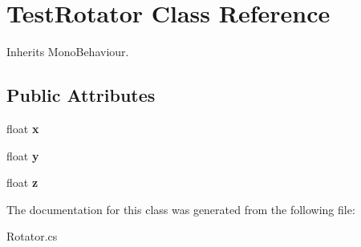 \hypertarget{class_test_rotator}{\section{Test\+Rotator Class Reference}
\label{class_test_rotator}
}


Inherits Mono\+Behaviour.

\subsection*{Public Attributes}
\begin{DoxyCompactItemize}
\item 
\hypertarget{class_test_rotator_a35747d7e4726859f308aca6e1cccfe9c}{float {\bfseries x}}\label{class_test_rotator_a35747d7e4726859f308aca6e1cccfe9c}

\item 
\hypertarget{class_test_rotator_a93ff864e68be6ac51cac60c949b9bf1a}{float {\bfseries y}}\label{class_test_rotator_a93ff864e68be6ac51cac60c949b9bf1a}

\item 
\hypertarget{class_test_rotator_a18d56147a4ae1b47ee5cd0c1dfc2aa9b}{float {\bfseries z}}\label{class_test_rotator_a18d56147a4ae1b47ee5cd0c1dfc2aa9b}

\end{DoxyCompactItemize}


The documentation for this class was generated from the following file\+:\begin{DoxyCompactItemize}
\item 
Rotator.\+cs\end{DoxyCompactItemize}
